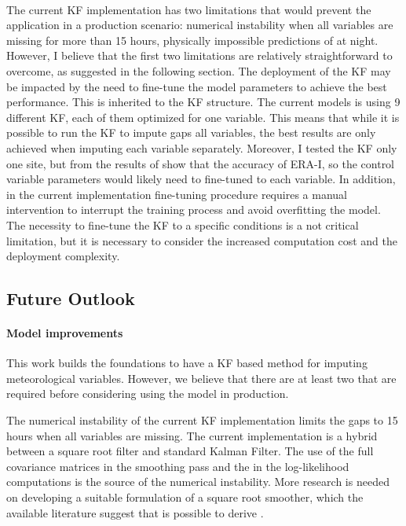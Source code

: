 \documentclass{article}
\let\Oldsubsection\subsection
\renewcommand{\subsection}{\FloatBarrier\Oldsubsection}
\begin{document}
\paragraph{} The current KF implementation has two limitations that would prevent the application in a production scenario: numerical instability when all variables are missing for more than 15 hours, physically impossible predictions of  at night. However, I believe that the first two limitations are relatively straightforward to overcome, as suggested in the following section. The deployment of the KF may be impacted by the need to fine-tune the model parameters to achieve the best performance. This is inherited to the KF structure.
The current models is using 9 different KF, each of them optimized for one variable. This means that while it is possible to run the KF to impute gaps all variables, the best results are only achieved when imputing each variable separately. Moreover, I tested the KF only one site, but from the results of \cite{vuichard_filling_2015} show that the accuracy of ERA-I, so the control variable parameters would likely need to fine-tuned to each variable. In addition, in the current implementation fine-tuning procedure requires a manual intervention to interrupt the training process and avoid overfitting the model.
The necessity to fine-tune the KF to a specific conditions is a not critical limitation, but it is necessary to consider the increased computation cost and the deployment complexity. 


\subsection{Future Outlook}

\paragraph{Model improvements} This work builds the foundations to have a KF based method for imputing meteorological variables. However, we believe that there are at least two that are required before considering using the model in production.

The numerical instability of the current KF implementation limits the gaps to 15 hours when all variables are missing. The current implementation is a hybrid between a square root filter and standard Kalman Filter. The use of the full covariance matrices in the smoothing pass and the in the log-likelihood computations is the source of the numerical instability. More research is needed on developing a suitable formulation of a square root smoother, which the available literature suggest that is possible to derive \cite{rutten_square-root_2013, park_new_1996}. 
\end{document}

